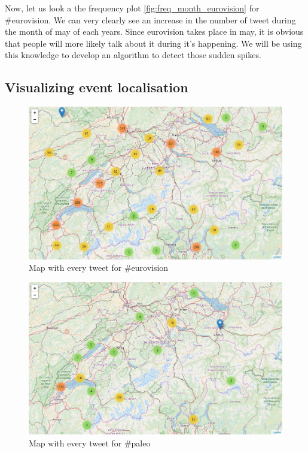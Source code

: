 \documentclass[11pt]{article}
\begin{document}
Now, let us look a the frequency plot \ref{fig:freq_month_eurovision} for \#eurovision.
We can very clearly see an increase in the number of tweet during the month of may of each years. Since eurovision takes place in may, it is obvious that people will more likely talk about it during it's happening. We will be using this knowledge to develop an algorithm to detect those sudden spikes.

\subsection{Visualizing event localisation}

\begin{figure}[htbp]
  \vspace*{-1mm}
  \centering
  \includegraphics[width=\columnwidth]{figures/map_eurovision.png}
  \vspace{-5mm}
  \caption{Map with every tweet for \#eurovision}
  \label{fig:map_eurovision}
\end{figure}

\begin{figure}[htbp]
  \vspace*{-1mm}
  \centering
  \includegraphics[width=\columnwidth]{figures/map_paleo.png}
  \vspace{-5mm}
  \caption{Map with every tweet for \#paleo}
  \label{fig:map_paleo}
\end{figure}
\end{document}
